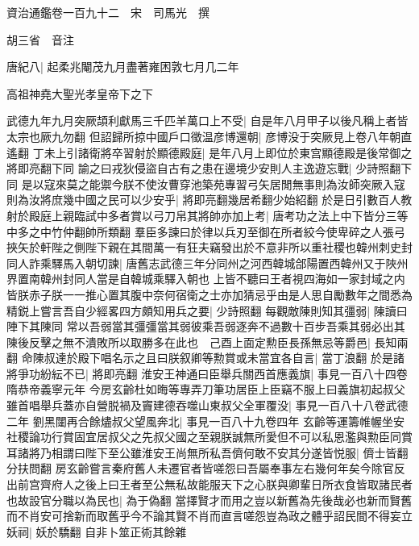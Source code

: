 資治通鑑卷一百九十二　宋　司馬光　撰

胡三省　音注

唐紀八|{
	起柔兆閹茂九月盡著雍困敦七月几二年}


高祖神堯大聖光孝皇帝下之下

武德九年九月突厥頡利獻馬三千匹羊萬口上不受|{
	自是年八月甲子以後凡稱上者皆太宗也厥九勿翻}
但詔歸所掠中國戶口徵温彦博還朝|{
	彦博没于突厥見上卷八年朝直遙翻}
丁未上引諸衛將卒習射於顯德殿庭|{
	是年八月上即位於東宫顯德殿是後常御之將即亮翻下同}
諭之曰戎狄侵盜自古有之患在邊境少安則人主逸遊忘戰|{
	少詩照翻下同}
是以寇來莫之能禦今朕不使汝曹穿池築苑專習弓矢居閒無事則為汝師突厥入寇則為汝將庶幾中國之民可以少安乎|{
	將即亮翻幾居希翻少始紹翻}
於是日引數百人教射於殿庭上親臨試中多者賞以弓刀帛其將帥亦加上考|{
	唐考功之法上中下皆分三等中多之中竹仲翻帥所類翻}
羣臣多諫曰於律以兵刃至御在所者絞今使卑碎之人張弓挾矢於軒陛之側陛下親在其間萬一有狂夫竊發出於不意非所以重社稷也韓州刺史封同人詐乘驛馬入朝切諫|{
	唐舊志武德三年分同州之河西韓城郃陽置西韓州又于陜州界置南韓州封同人當是自韓城乘驛入朝也}
上皆不聽曰王者視四海如一家封域之内皆朕赤子朕一一推心置其腹中奈何宿衛之士亦加猜忌乎由是人思自勵數年之間悉為精鋭上嘗言吾自少經畧四方頗知用兵之要|{
	少詩照翻}
每觀敵陳則知其彊弱|{
	陳讀曰陣下其陳同}
常以吾弱當其彊彊當其弱彼乘吾弱逐奔不過數十百步吾乘其弱必出其陳後反擊之無不潰敗所以取勝多在此也　己酉上面定勲臣長孫無忌等爵邑|{
	長知兩翻}
命陳叔達於殿下唱名示之且曰朕叙卿等勲賞或未當宜各自言|{
	當丁浪翻}
於是諸將爭功紛紜不已|{
	將即亮翻}
淮安王神通曰臣舉兵關西首應義旗|{
	事見一百八十四卷隋恭帝義寧元年}
今房玄齡杜如晦等專弄刀筆功居臣上臣竊不服上曰義旗初起叔父雖首唱舉兵蓋亦自營脱禍及竇建德吞噬山東叔父全軍覆没|{
	事見一百八十八卷武德二年}
劉黑闥再合餘燼叔父望風奔北|{
	事見一百八十九卷四年}
玄齡等運籌帷幄坐安社稷論功行賞固宜居叔父之先叔父國之至親朕誠無所愛但不可以私恩濫與勲臣同賞耳諸將乃相謂曰陛下至公雖淮安王尚無所私吾儕何敢不安其分遂皆悦服|{
	儕士皆翻分扶問翻}
房玄齡嘗言秦府舊人未遷官者皆嗟怨曰吾屬奉事左右幾何年矣今除官反出前宫齊府人之後上曰王者至公無私故能服天下之心朕與卿輩日所衣食皆取諸民者也故設官分職以為民也|{
	為于偽翻}
當擇賢才而用之豈以新舊為先後哉必也新而賢舊而不肖安可捨新而取舊乎今不論其賢不肖而直言嗟怨豈為政之體乎詔民間不得妄立妖祠|{
	妖於驕翻}
自非卜筮正術其餘雜


